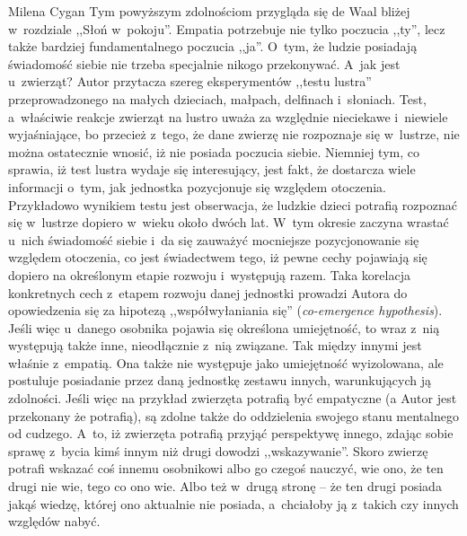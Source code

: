 \begin{recplenv}{Milena Cygan}
Tym powyższym zdolnościom przygląda się de Waal bliżej w~rozdziale ,,Słoń w~pokoju''. Empatia potrzebuje nie tylko
poczucia ,,ty'', lecz także bardziej fundamentalnego poczucia ,,ja''. O~tym, że ludzie posiadają świadomość siebie nie
trzeba specjalnie nikogo przekonywać. A~jak jest u~zwierząt? Autor przytacza szereg eksperymentów ,,testu lustra''
przeprowadzonego na małych dzieciach, małpach, delfinach i~słoniach. Test, a~właściwie reakcje zwierząt na lustro uważa
za względnie nieciekawe i~niewiele wyjaśniające, bo przecież z~tego, że dane zwierzę nie rozpoznaje się w~lustrze, nie
można ostatecznie wnosić, iż nie posiada poczucia siebie. Niemniej tym, co sprawia, iż test lustra wydaje się
interesujący, jest fakt, że dostarcza wiele informacji o~tym, jak jednostka pozycjonuje się względem otoczenia.
Przykładowo wynikiem testu jest obserwacja, że ludzkie dzieci potrafią rozpoznać się w~lustrze dopiero w~wieku około
dwóch lat. W~tym okresie zaczyna wrastać u~nich świadomość siebie i~da się zauważyć mocniejsze pozycjonowanie się
względem otoczenia, co jest świadectwem tego, iż pewne cechy pojawiają się dopiero na określonym etapie
rozwoju i~występują razem. Taka korelacja konkretnych cech z~etapem rozwoju danej jednostki prowadzi Autora do opowiedzenia się
za hipotezą ,,współwyłaniania się'' (\textit{co-emergence hypothesis}). Jeśli więc u~danego osobnika pojawia się
określona umiejętność, to wraz z~nią występują także inne, nieodłącznie z~nią związane. Tak między innymi jest właśnie
z~empatią. Ona także nie występuje jako umiejętność wyizolowana, ale postuluje posiadanie przez daną jednostkę zestawu
innych, warunkujących ją zdolności. Jeśli więc na przykład zwierzęta potrafią być empatyczne (a Autor jest przekonany
że potrafią), są zdolne także do oddzielenia swojego stanu mentalnego od cudzego. A~to, iż zwierzęta potrafią przyjąć
perspektywę innego, zdając sobie sprawę z~bycia kimś innym niż drugi dowodzi ,,wskazywanie''. Skoro zwierzę potrafi
wskazać coś innemu osobnikowi albo go czegoś nauczyć, wie ono, że ten drugi nie wie, tego co ono wie. Albo też w~drugą
stronę -- że ten drugi posiada jakąś wiedzę, której ono aktualnie nie posiada, a~chciałoby ją z~takich czy innych
względów nabyć.

\enlargethispage{-.5\baselineskip}


\end{recplenv}
